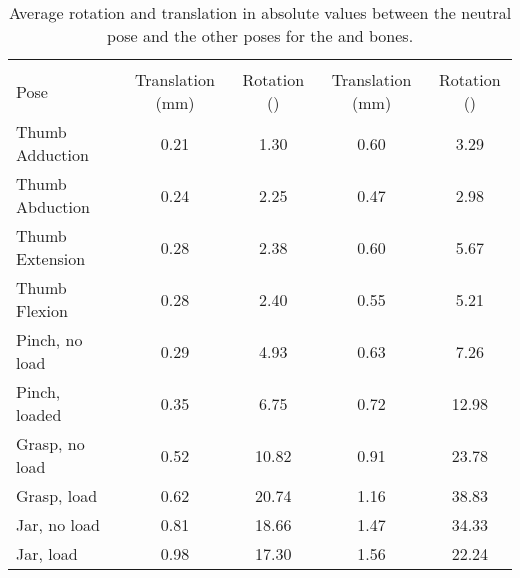 \begin{table}[!ht]
	\centering
	\begin{tabular}{lcc|cc}
		\toprule
		& \multicolumn{2}{c}{\lun*} & \multicolumn{2}{c}{\ham*}  \\
		Pose & Translation (mm) & Rotation (\degre) & Translation (mm) & Rotation (\degre) \\
		\midrule
		Thumb Adduction & 0.21 & 1.30 & 0.60 & 3.29\\
		Thumb Abduction & 0.24 & 2.25 & 0.47 & 2.98\\
		Thumb Extension & 0.28 & 2.38 & 0.60 & 5.67\\
		Thumb Flexion & 0.28 & 2.40 & 0.55 & 5.21\\
		Pinch, no load & 0.29 & 4.93 & 0.63 & 7.26\\
		Pinch, loaded & 0.35 & 6.75 & 0.72 & 12.98\\
		Grasp, no load & 0.52 & 10.82 & 0.91 & 23.78\\
		Grasp, load & 0.62 & 20.74 & 1.16 & 38.83\\
		Jar, no load & 0.81 & 18.66 & 1.47 & 34.33\\
		Jar, load & 0.98 & 17.30 & 1.56 & 22.24\\
		\bottomrule
	\end{tabular}
	\caption[Average transformation from neutral pose to all other for the \lun* and \ham*]{Average rotation and translation in absolute values between the neutral pose and the other poses for the \lun* and \ham* bones.}
	\label{tab:5_average_transfo_to_poses_lun_ham}
\end{table}

